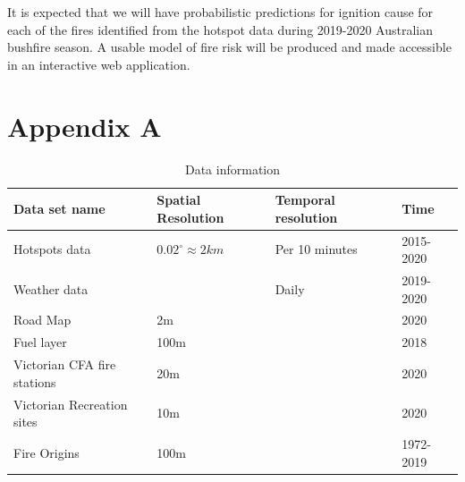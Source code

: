 \documentclass[11pt,a4paper,]{article}
\begin{document}
It is expected that we will have probabilistic predictions for ignition cause for each of the fires identified from the hotspot data during 2019-2020 Australian bushfire season. A usable model of fire risk will be produced and made accessible in an interactive web application.

\newpage

\hypertarget{appendix-a}{%
\section*{Appendix A}\label{appendix-a}}

\begin{table}

\caption{\label{tab:datasetinfo}Data information}
\centering
\begin{tabular}[t]{llll}
\toprule
Data set name & Spatial Resolution & Temporal resolution & Time\\
\midrule
Hotspots data & $0.02^\circ \approx 2km$ & Per 10 minutes & 2015-2020\\
Weather data &  & Daily & 2019-2020\\
Road Map & 2m &  & 2020\\
Fuel layer & 100m &  & 2018\\
Victorian CFA fire stations & 20m &  & 2020\\
\addlinespace
Victorian Recreation sites & 10m &  & 2020\\
Fire Origins & 100m &  & 1972-2019\\
\bottomrule
\end{tabular}
\end{table}
\end{document}
